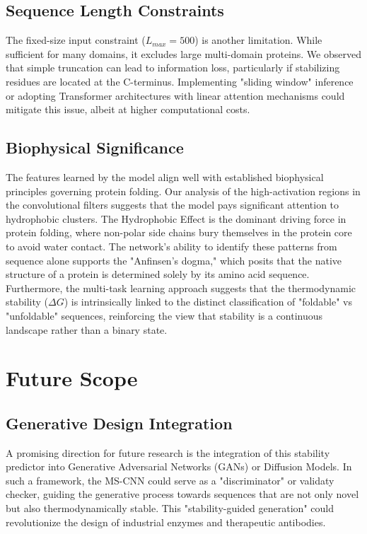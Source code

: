 \documentclass[conference]{IEEEtran}
\begin{document}
\subsection{Sequence Length Constraints}
The fixed-size input constraint ($L_{max}=500$) is another limitation. While sufficient for many domains, it excludes large multi-domain proteins. We observed that simple truncation can lead to information loss, particularly if stabilizing residues are located at the C-terminus. Implementing "sliding window" inference or adopting Transformer architectures with linear attention mechanisms could mitigate this issue, albeit at higher computational costs.

\subsection{Biophysical Significance}
The features learned by the model align well with established biophysical principles governing protein folding. Our analysis of the high-activation regions in the convolutional filters suggests that the model pays significant attention to hydrophobic clusters. The Hydrophobic Effect is the dominant driving force in protein folding, where non-polar side chains bury themselves in the protein core to avoid water contact.
The network's ability to identify these patterns from sequence alone supports the "Anfinsen's dogma," which posits that the native structure of a protein is determined solely by its amino acid sequence. Furthermore, the multi-task learning approach suggests that the thermodynamic stability ($\Delta G$) is intrinsically linked to the distinct classification of "foldable" vs "unfoldable" sequences, reinforcing the view that stability is a continuous landscape rather than a binary state.

\section{Future Scope}
\subsection{Generative Design Integration}
A promising direction for future research is the integration of this stability predictor into Generative Adversarial Networks (GANs) or Diffusion Models. In such a framework, the MS-CNN could serve as a "discriminator" or validaty checker, guiding the generative process towards sequences that are not only novel but also thermodynamically stable. This "stability-guided generation" could revolutionize the design of industrial enzymes and therapeutic antibodies.
\end{document}
